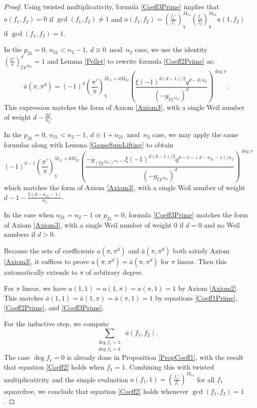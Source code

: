 \documentclass[11pt,letterpaper]{article}
\theoremstyle{definition}
\theoremstyle{remark}
\numberwithin{equation}{section}
\theoremstyle{dotless}
\newcommand{\res}[2]{\left(\frac{#1}{#2}\right)}
\begin{document}
\begin{proof}
Using twisted multiplicativity, formula \eqref{Coeff3Prime} implies that $a(f_1, f_2) = 0$ if $\gcd(f_1, f_2) \neq 1$ and $a(f_1, f_2) = \res{f_1'}{f_1}_{\chi}^{M_{11}} \res{f_1}{f_2}_{\chi}^{M_{21}} a(1, f_2)$ if $\gcd(f_1, f_2) = 1$.

In the $p_{21}=0$, $n_{21}<n_2-1$, $d \equiv 0 \bmod n_2$ case, we use the identity $\res{\pi'}{\pi}_{ \xi \chi^{M_{22}}}^d=1$ and Lemma \ref{Pellet} to rewrite formula \eqref{Coeff2Prime} as:
\begin{equation*} 
\bar{a}(\pi, \pi^{d}) = (-1)^d \res{\pi'}{\pi}_{\chi}^{M_{11}+dM_{22}} \left(\frac{\xi(-1)^{d(d-1)/2}q^{d-d/n_2}}{(-g_{\xi \chi^{M_{22}}})^d}\right)^{\deg \pi}.
\end{equation*}
This expression matches the form of Axiom \ref{Axiom3}, with a single Weil number of weight $d-\frac{2d}{n_2}$. 

In the $p_{21}=0$, $n_{21}<n_2-1$, $d \equiv 1+n_{21} \bmod n_2$ case, we may apply the same formulas along with Lemma \ref{GaussSumLifting} to obtain
\begin{equation*} (-1)^{d-1}\res{\pi'}{\pi}_{\chi}^{M_{11}+d M_{22}}
\left( \frac{-g_{(\xi \chi^{M_{22}})^{n_{21}+1}} \xi(-1)^{d(d-1)/2} q^{d-1-(d-n_{21}-1)/n_2}}{(-g_{\xi \chi^{M_{22}}})^d} \right)^{\deg \pi}
\end{equation*}
which matches the form of Axiom \ref{Axiom3}, with a single Weil number of weight $d-1-\frac{2(d-n_{21}-1)}{n_2}$. 

In the case when $n_{21}=n_2-1$ or $p_{21}=0$, formula \eqref{Coeff3Prime} matches the form of Axiom \ref{Axiom3}, with a single Weil number of weight $0$ if $d=0$ and no Weil numbers if $d>0$.

Because the sets of coefficients $a(\pi, \pi^d)$ and $\bar{a}(\pi, \pi^d)$ both satisfy Axiom \ref{Axiom3}, it suffices to prove $a(\pi, \pi^d)=\bar{a}(\pi, \pi^d)$ for $\pi$ linear. Then this automatically extends to $\pi$ of arbitrary degree.

For $\pi$ linear, we have $a(1, 1)=a(1, \pi)=a(\pi, 1)=1$ by Axiom \ref{Axiom2}. This matches $\bar{a}(1, 1)=\bar{a}(1, \pi)=\bar{a}(\pi, 1)=1$ by equations \eqref{Coeff1Prime}, \eqref{Coeff2Prime}, and \eqref{Coeff3Prime}.

For the inductive step, we compute 
\begin{equation*}
\sum_{\substack{\deg f_1 = 1, \\ \deg f_2 = d}} \bar{a}(f_1, f_2).
\end{equation*}
The case $\deg f_1=0$ is already done in Proposition \ref{PropCoeff1}, with the result that equation \eqref{Coeff2} holds when $f_1=1$. Combining this with twisted multiplicativity and the simple evaluation $a(f_1, 1)=\res{f_1'}{f_1}^{M_{11}}$ for all $f_1$ squarefree, we conclude that equation \eqref{Coeff2} holds whenever $\gcd(f_1, f_2)=1$. 


\end{proof}
\end{document}
